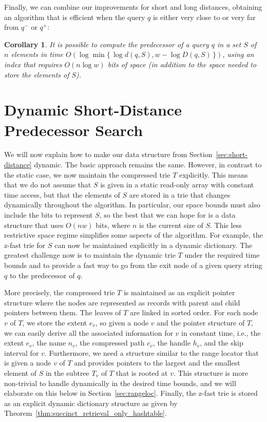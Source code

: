 \documentclass[a4paper,11pt]{article}
\newtheorem{corollary}[theorem]{Corollary}
\newcommand{\?}{\mskip1.5mu}
\begin{document}
Finally, we can combine our improvements for short and long 
distances, obtaining an algorithm that is
efficient when the query $q$ is either very close to or very far 
from $q^-$ or $q^+$:

\begin{corollary}\label{cor:long_speedup}
It is possible to compute the predecessor of a query $q$ in a set $S$
of $n$ elements in time $O(\log \min \{\,\log d(q, S), w - \log D(q,S)\,\})$, 
using an index that
requires $O(n \log w)$ bits of space (in addition to the space
needed to store the elements of $S$).
\end{corollary}

\section{Dynamic Short-Distance Predecessor Search}
\label{sec:dyn_pred}

We will now explain how to make our data
structure
from Section~\ref{sec:short-distance} dynamic.
The basic approach remains the same.
However, in contrast to the static case, we now 
maintain the compressed trie $T$ explicitly. 
This means that we do not assume that $S$
is given in a static read-only array with constant
time access, but that the elements of $S$
are stored in a trie that changes dynamically throughout
the algorithm. In particular, our space bounds must also 
include the bits to represent $S$, so the best 
that we can hope for is a data structure that uses $O(nw)$
bits, where $n$ is the current size of $S$. This less restrictive
space regime simplifies some aspects of the algorithm. For example,
the z-fast trie for $S$ can now be maintained explicitly in a
dynamic dictionary. The greatest challenge now is to maintain
the dynamic trie $T$ under the required time bounds and to provide
a fast way to go from the exit node of a given query string $q$ to the 
predecessor of $q$.

More precisely, the compressed trie $T$ is maintained as
an explicit pointer structure where the nodes are represented
as records with parent and
child pointers between them. The leaves of $T$ are
linked in sorted order. For each node
$v$ of $T$, we store the extent $e_v$,
so given a node $v$ and the pointer structure
of $T$, we can easily derive all the associated
information for $v$ in constant time, i.e., the extent $e_v$, 
the name $n_v$, the compressed path $c_v$, the handle $h_v$, and the skip 
interval for $v$.
Furthermore, we need a structure similar to the range locator 
that is given a node $v$ of $T$ and provides pointers to
the largest and the smallest element of $S$ in the subtree
$T_v$ of $T$ that is rooted at $v$. This structure is more non-trivial
to handle dynamically in the desired time bounds, and we will elaborate
on this below in Section~\ref{sec:rangeloc}. 
Finally, the z-fast trie is stored as an explicit
dynamic dictionary structure as given by 
Theorem~\ref{thm:succinct_retrieval_only_hashtable}.
\end{document}
